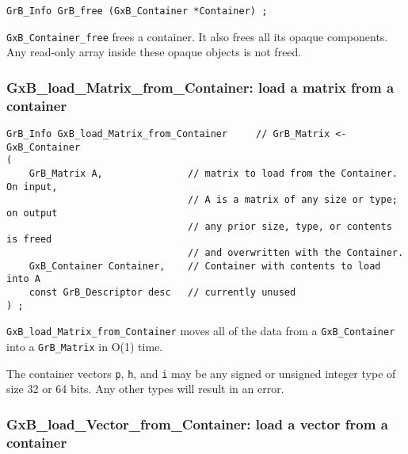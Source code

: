 \begin{mdframed}[userdefinedwidth=6in]
{\footnotesize
\begin{verbatim}
GrB_Info GrB_free (GxB_Container *Container) ;
\end{verbatim}
} \end{mdframed}

\verb'GxB_Container_free' frees a container.  It also frees all its opaque
components.  Any read-only array inside these opaque objects is not freed.

\subsubsection{{\sf GxB\_load\_Matrix\_from\_Container:} load a matrix from a container}
\label{load_matrix_from_container}

\begin{mdframed}[userdefinedwidth=6in]
{\footnotesize
\begin{verbatim}
GrB_Info GxB_load_Matrix_from_Container     // GrB_Matrix <- GxB_Container
(
    GrB_Matrix A,               // matrix to load from the Container.  On input,
                                // A is a matrix of any size or type; on output
                                // any prior size, type, or contents is freed
                                // and overwritten with the Container.
    GxB_Container Container,    // Container with contents to load into A
    const GrB_Descriptor desc   // currently unused
) ;
\end{verbatim}
} \end{mdframed}

\verb'GxB_load_Matrix_from_Container' moves all of the data from a
\verb'GxB_Container' into a \verb'GrB_Matrix' in O(1) time.

The container vectors \verb'p', \verb'h', and \verb'i' may be any signed or
unsigned integer type of size 32 or 64 bits.  Any other types will result in
an error.

\subsubsection{{\sf GxB\_load\_Vector\_from\_Container:} load a vector from a container}
\label{load_vector_from_container}

